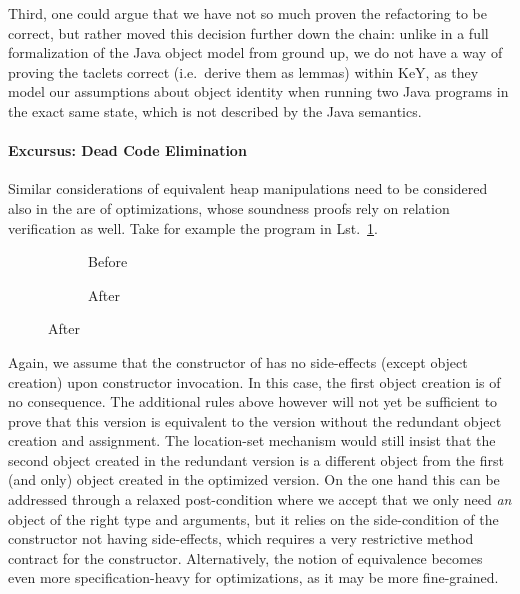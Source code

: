 Third, one could argue that we have not so much proven the refactoring to be correct,
but rather moved this decision further down the chain: unlike in a full formalization of the Java object model from ground up, 
we do not have a way of proving the taclets correct (i.e.\ derive them as lemmas) within KeY, as they model our assumptions about object identity when running two Java programs in the exact same state, which is not described by the Java semantics.


\paragraph*{Excursus: Dead Code Elimination}
Similar considerations of equivalent heap manipulations need to be considered also in the are of optimizations, whose soundness proofs rely on relation verification as well.
Take for example the program in Lst.~\ref{lst:xisnewxisnew}.
\begin{figure}
  \centering
  \begin{subfigure}[b]{.2\linewidth}
    
    \caption{Before}
  \end{subfigure}\hspace{1cm}
  \begin{subfigure}[b]{.2\linewidth}
    
    \caption{After}
  \end{subfigure}
\label{lst:xisnewxisnew}
\end{figure}

Again, we assume that the constructor of  has no side-effects (except object creation) upon constructor invocation.
In this case, the first object creation is of no consequence.
The additional rules above however will not yet be sufficient to prove that this version is equivalent to the version without the redundant object creation and assignment.
The location-set mechanism would still insist that the second object created  in the redundant version is a different object from the first (and only) object created in the optimized version.
On the one hand this can be addressed through a relaxed post-condition where we accept that we only need \textit{an} object of the right type and arguments, but it relies on the side-condition of the constructor not having side-effects, which requires a very restrictive method contract for the constructor.
Alternatively, the notion of equivalence becomes even more specification-heavy for optimizations, as it may be more fine-grained. 

